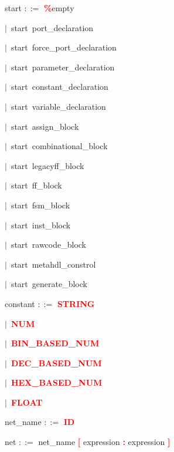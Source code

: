 
\vspace{1em}
\noindent
\settowidth{\parindent}{\hspace{4ex}}
start $::=$\hspace{1ex} \textbf{\textcolor{red}{\%}}empty

\mbox{$|$ start port\_declaration}

\mbox{$|$ start force\_port\_declaration}

\mbox{$|$ start parameter\_declaration}

\mbox{$|$ start constant\_declaration}

\mbox{$|$ start variable\_declaration}

\mbox{$|$ start assign\_block}

\mbox{$|$ start combinational\_block}

\mbox{$|$ start legacyff\_block}

\mbox{$|$ start ff\_block}

\mbox{$|$ start fsm\_block}

\mbox{$|$ start inst\_block}

\mbox{$|$ start rawcode\_block}

\mbox{$|$ start metahdl\_constrol}

\mbox{$|$ start generate\_block}

\vspace{1em}
\noindent
\settowidth{\parindent}{\hspace{4ex}}
constant $::=$\hspace{1ex} \textbf{\textcolor{red}{STRING}}

\mbox{$|$ \textbf{\textcolor{red}{NUM}}}

\mbox{$|$ \textbf{\textcolor{red}{BIN\_BASED\_NUM}}}

\mbox{$|$ \textbf{\textcolor{red}{DEC\_BASED\_NUM}}}

\mbox{$|$ \textbf{\textcolor{red}{HEX\_BASED\_NUM}}}

\mbox{$|$ \textbf{\textcolor{red}{FLOAT}}}

\vspace{1em}
\noindent
\settowidth{\parindent}{\hspace{4ex}}
net\_name $::=$\hspace{1ex} \textbf{\textcolor{red}{ID}}

\vspace{1em}
\noindent
\settowidth{\parindent}{\hspace{4ex}}
net $::=$\hspace{1ex} net\_name \textbf{\textcolor{red}{[}} expression \textbf{\textcolor{red}{:}} expression \textbf{\textcolor{red}{]}}

